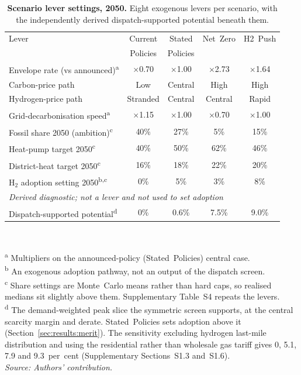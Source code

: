 \begin{table}[htbp]
 \centering
 \caption{\textbf{Scenario lever settings, 2050.} Eight exogenous levers per scenario,
 with the independently derived dispatch-supported potential beneath them.}
 \label{tab:levers_body}
 \begin{tabular}{lcccc}
 \toprule
 Lever & Current & Stated & Net~Zero & H2~Push \\
 & Policies & Policies & & \\
 \midrule
 Envelope rate (vs announced)\textsuperscript{a} & $\times$0.70 & $\times$1.00 & $\times$2.73 & $\times$1.64 \\
 Carbon-price path & Low & Central & High & High \\
 Hydrogen-price path & Stranded & Central & Central & Rapid \\
 Grid-decarbonisation speed\textsuperscript{a} & $\times$1.15 & $\times$1.00 & $\times$0.70 & $\times$1.00 \\
 Fossil share 2050 (ambition)\textsuperscript{c} & 40\% & 27\% & 5\% & 15\% \\
  Heat-pump target 2050\textsuperscript{c} & 40\% & 50\% & 62\% & 46\% \\
 District-heat target 2050\textsuperscript{c} & 16\% & 18\% & 22\% & 20\% \\
 H$_2$ adoption setting 2050\textsuperscript{b,c} & 0\% & 5\% & 3\% & 8\% \\
 \midrule
  \multicolumn{5}{l}{\textit{Derived diagnostic; not a lever and not used to set adoption}} \\
 Dispatch-supported potential\textsuperscript{d} & 0\% & 0.6\% & 7.5\% & 9.0\% \\
 \bottomrule
 \end{tabular}
 \\[3pt]{\footnotesize\raggedright
 \textsuperscript{a} Multipliers on the announced-policy (Stated~Policies) central case.\\
 \textsuperscript{b} An exogenous adoption pathway, not an output of the dispatch screen.\\
 \textsuperscript{c} Share settings are Monte~Carlo means rather than hard caps, so
 realised medians sit slightly above them. Supplementary Table~S4 repeats the levers.\\
 \textsuperscript{d} The demand-weighted peak slice the symmetric screen supports, at the
 central scarcity margin and derate. Stated~Policies sets adoption above it
 (Section~\ref{sec:results:merit}). The sensitivity excluding hydrogen last-mile
 distribution and using the residential rather than wholesale gas tariff gives 0, 5.1,
 7.9 and 9.3~per~cent (Supplementary Sections~S1.3 and~S1.6).\\
 \textit{Source: Authors' contribution.}\par}
\end{table}

